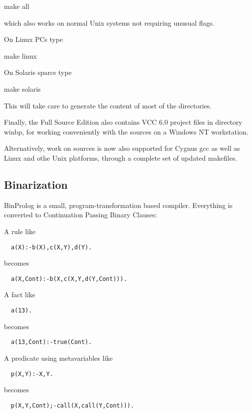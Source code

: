 \documentclass{article}
\begin{document}
  make all

which also works on normal Unix systems not requiring unusual flags.

On Linux PCs type

  make linux

On Solaris sparcs type

  make solaris

This will take care to generate the content of most of the directories.

Finally, the Full Source Edition also contains VCC 6.0 project files
in directory winbp, for working conveniently with the sources on a 
Windows NT workstation.

Alternatively, work on sources is now also supported for Cygnus gcc
as well as Linux and othe Unix platforms, through a complete set of
updated makefiles.


\subsection{Binarization}
BinProlog is a small, program-transformation based compiler. Everything is
converted to Continuation Passing Binary Clauses:

{\flushleft A rule like} 

\begin{verbatim}
  a(X):-b(X),c(X,Y),d(Y).
\end{verbatim}

{\flushleft becomes}

\begin{verbatim}
  a(X,Cont):-b(X,c(X,Y,d(Y,Cont))).
\end{verbatim}

{\flushleft A} fact like

\begin{verbatim}
  a(13).
\end{verbatim}

{\flushleft becomes}

\begin{verbatim}
  a(13,Cont):-true(Cont).
\end{verbatim}

{\flushleft A} predicate using metavariables like

\begin{verbatim}
  p(X,Y):-X,Y.
\end{verbatim}

{\flushleft becomes}

\begin{verbatim}
  p(X,Y,Cont);-call(X,call(Y,Cont))).
\end{verbatim}
\end{document}
